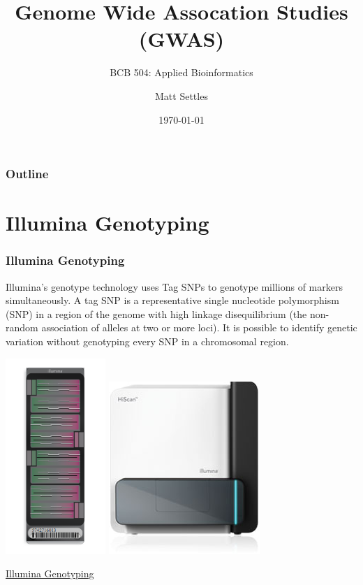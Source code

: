 \documentclass[pdf]{beamer}
\begin{document}
\title[GWAS]{Genome Wide Assocation Studies (GWAS)}
\subtitle{BCB 504: Applied Bioinformatics\\}
\author[Matt Settles]{Matt Settles}
\date{\today}


\begin{frame}[plain]
  \titlepage
\end{frame}


\begin{frame}[plain] 
  \frametitle{Outline}
  \tableofcontents
\end{frame}

\section{Illumina Genotyping}
\begin{frame}
  \frametitle{Illumina Genotyping}
  Illumina's genotype technology uses \alert{Tag SNPs} to genotype millions of markers simultaneously. A tag SNP is a representative single nucleotide polymorphism (SNP) in a region of the genome with high linkage disequilibrium (the non-random association of alleles at two or more loci). It is possible to identify genetic variation without genotyping every SNP in a chromosomal region.
  \begin{center}
    \includegraphics[scale=0.3]{Figures/omni.png} 
    \includegraphics[scale=0.3]{Figures/hiscan.png} 
  \end{center}
  \begin{center}
       \href{http://www.illumina.com/applications/gwas.ilmn}{Illumina Genotyping}
  \end{center}  
\end{frame}
\end{document}
